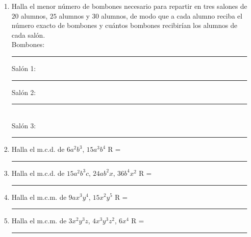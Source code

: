 \documentclass[14pt]{exam}
\begin{document}
\begin{enumerate}
\item Halla el menor número de bombones necesario para repartir en tres salones de $20$ alumnos, $25$ alumnos y $30$ alumnos, de modo que a cada alumno reciba el número exacto de bombones y cuántos bombones recibirían los alumnos de cada salón. \\[0.5em]
Bombones: \rule{1.5cm}{0.1mm} \hspace{1cm} Salón 1: \rule{1.5cm}{0.1mm} \hspace{1cm} Salón 2:\rule{1.5cm}{0.1mm} \\[0.5em]
Salón 3: \rule{1.5cm}{0.1mm}
\item Halla el m.c.d. de $6 a^{2} b^{3}$, $15 a^{3} b^{4}$ R = \rule{2cm}{0.1mm}
\item Halla el m.c.d. de $15 a^{2} b^{3} c$, $24 a b^{2}x$, $36 b^{4} x^{2}$ R = \rule{2cm}{0.1mm}
\item Halla el m.c.m. de $9 a x^{3} y^{4}$, $15 x^{2} y^{5}$ R = \rule{2cm}{0.1mm}
\item Halla el m.c.m. de $3 x^{2} y^{3} z$, $4 x^{3} y^{3} z^{2}$, $6 x^{4}$ R = \rule{2cm}{0.1mm}
\end{enumerate}
\end{document}
